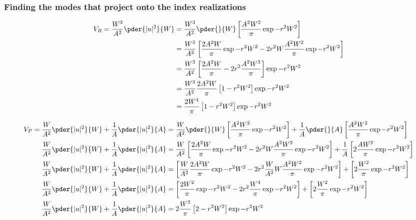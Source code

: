 \subsubsection{Finding the modes that project onto the index realizations}

\begin{equation}
\begin{split}
      V_{R} = \frac{W^3}{A^2 } \pder{|u|^2}{W} &= \frac{W^3}{A^2 }\pder{}{W}\left[\frac{A^2W^2}{\pi} \exp{-r^2 W^2}  \right]\\
      &=\frac{W^3}{A^2 }\left[\frac{2 A^2W}{\pi} \exp{-r^2 W^2} - 2 r^2 W\frac{A^2W^2}{\pi} \exp{-r^2 W^2}  \right]\\
      &=\frac{W^3}{A^2 }\left[\frac{2 A^2W}{\pi}  - 2 r^2 \frac{A^2W^3}{\pi} \right]\exp{-r^2 W^2}\\
      &=\frac{W^3}{A^2 }\frac{2 A^2W}{\pi} \left[1  -  r^2 W^2\right]\exp{-r^2 W^2}\\
      &=\frac{2 W^4}{\pi}\left[1  -  r^2 W^2\right]\exp{-r^2 W^2}\\
\end{split}
\end{equation}

\begin{equation}
\begin{split}
      V_{P} = \frac{W}{A^2 } \pder{|u|^2}{W} + \frac{1}{A}\pder{|u|^2}{A} &= \frac{W}{A^2}\pder{}{W}\left[\frac{A^2W^2}{\pi} \exp{-r^2 W^2}\right] + \frac{1}{A}\pder{}{A}\left[\frac{A^2W^2}{\pi} \exp{-r^2 W^2}\right] \\
      \frac{W}{A^2 } \pder{|u|^2}{W} +\frac{1}{A}\pder{|u|^2}{A} &= \frac{W}{A^2}\left[\frac{2 A^2W}{\pi} \exp{-r^2 W^2} - 2 r^2 W\frac{A^2W^2}{\pi} \exp{-r^2 W^2}  \right] + \frac{1}{A}\left[2\frac{AW^2}{\pi} \exp{-r^2 W^2}\right] \\
    \frac{W}{A^2 } \pder{|u|^2}{W} +\frac{1}{A}\pder{|u|^2}{A} &=\left[ \frac{W}{A^2}\frac{2 A^2W}{\pi} \exp{-r^2 W^2} - 2 r^2  \frac{W}{A^2}W\frac{A^2W^2}{\pi} \exp{-r^2 W^2}  \right] + \left[2\frac{W^2}{\pi} \exp{-r^2 W^2}\right] \\
    \frac{W}{A^2 } \pder{|u|^2}{W} +\frac{1}{A}\pder{|u|^2}{A} &=\left[\frac{2 W^2}{\pi} \exp{-r^2 W^2} - 2 r^2 \frac{W^4}{\pi} \exp{-r^2 W^2}  \right] + \left[2\frac{W^2}{\pi} \exp{-r^2 W^2}\right] \\   
    \frac{W}{A^2 } \pder{|u|^2}{W} +\frac{1}{A}\pder{|u|^2}{A} &=2\frac{W^2}{\pi} \left[ 2 - r^2 W^2\right] \exp{-r^2 W^2}
\end{split}
\end{equation}

